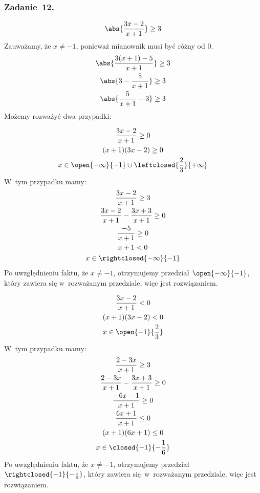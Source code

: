 \subsubsection*{Zadanie~12.}
\begin{equation*}
    \abs{\frac{3x - 2}{x + 1}} \geq 3\\
\end{equation*}
Zauważamy, że \(x \neq -1\), ponieważ mianownik musi być różny od \(0\).
\begin{gather*}
    \abs{\frac{3(x + 1) - 5}{x + 1}} \geq 3\\
    \abs{3 - \frac{5}{x + 1}} \geq 3\\
    \abs{\frac{5}{x + 1} - 3} \geq 3
\end{gather*}
Możemy rozważyć dwa przypadki:
\begin{proofcases}
    \item
        \begin{gather*}
            \frac{3x - 2}{x + 1} \geq 0\\
            (x + 1)(3x - 2) \geq 0\\
            x \in \open{-\infty}{-1} \cup \leftclosed{\frac{2}{3}}{+\infty}
        \end{gather*}
        W~tym przypadku mamy:
        \begin{gather*}
            \frac{3x - 2}{x + 1} \geq 3\\
            \frac{3x - 2}{x + 1} - \frac{3x + 3}{x + 1} \geq 0\\
            \frac{-5}{x + 1} \geq 0\\
            x + 1 < 0\\
            x \in \rightclosed{-\infty}{-1}
        \end{gather*}
        Po uwzględnieniu faktu, że \(x \neq -1\), otrzymujemy przedział \(\open{-\infty}{-1}\), który zawiera się w~rozważanym przedziale, więc jest rozwiązaniem.
    \item
        \begin{gather*}
            \frac{3x - 2}{x + 1} < 0\\
            (x + 1)(3x - 2) < 0\\
            x \in \open{-1}{\frac{2}{3}}
        \end{gather*}
        W~tym przypadku mamy:
        \begin{gather*}
            \frac{2 - 3x}{x + 1} \geq 3\\
            \frac{2 - 3x}{x + 1} - \frac{3x + 3}{x + 1} \geq 0\\
            \frac{-6x - 1}{x + 1} \geq 0\\
            \frac{6x + 1}{x + 1} \leq 0\\
            (x + 1)(6x + 1) \leq 0\\
            x \in \closed{-1}{-\frac{1}{6}}
        \end{gather*}
        Po uwzględnieniu faktu, że \(x \neq -1\), otrzymujemy przedział \(\rightclosed{-1}{-\frac{1}{6}}\), który zawiera się w~rozważanym przedziale, więc jest rozwiązaniem.
\end{proofcases}
